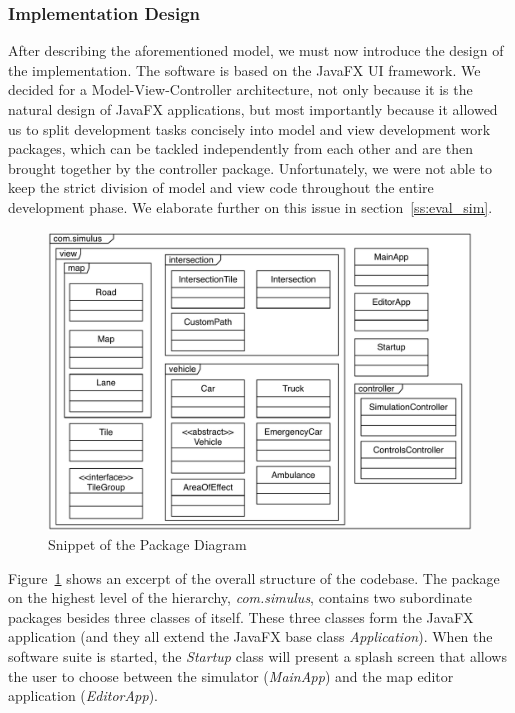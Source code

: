 \subsubsection*{Implementation Design}
	
After describing the aforementioned model, we must now introduce the design of the implementation. The software is based on the JavaFX UI framework. We decided for a Model-View-Controller architecture, not only because it is the natural design of JavaFX applications, but most importantly because it allowed us to split development tasks concisely into model and view development work packages, which can be tackled independently from each other and are then brought together by the controller package. Unfortunately, we were not able to keep the strict division of model and view code throughout the entire development phase. We elaborate further on this issue in section~\ref{ss:eval_sim}. 

\begin{figure}[t]
	\begin{center}
		\includegraphics[width=\textwidth]{img/package_diagram.pdf}
		\caption[Snippet of the Package Diagram]{Snippet of the Package Diagram}
		\label{fig:packages}
	\end{center}
\end{figure}

Figure~\ref{fig:packages} shows an excerpt of the overall structure of the codebase. The package on the highest level of the hierarchy, \textit{com.simulus}, contains two subordinate packages besides three classes of itself. These three classes form the JavaFX application (and they all extend the JavaFX base class \textit{Application}). When the software suite is started, the \textit{Startup} class will present a splash screen that allows the user to choose between the simulator (\textit{MainApp}) and the map editor application (\textit{EditorApp}).

